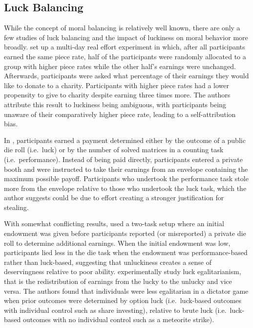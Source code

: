 \documentclass{article}
\begin{document}
\subsection{Luck Balancing}
While the concept of moral balancing is relatively well known, there are only a few studies of luck balancing and the impact of luckiness on moral behavior more broadly. \textcite{Tonin2017} set up a multi-day real effort experiment in which, after all participants earned the same piece rate, half of the participants were randomly allocated to a group with higher piece rates while the other half's earnings were unchanged. Afterwards, participants were asked what percentage of their earnings they would like to donate to a charity. Participants with higher piece rates had a lower propensity to give to charity despite earning three times more. The authors attribute this result to luckiness being ambiguous, with participants being unaware of their comparatively higher piece rate, leading to a self-attribution bias. 
\par
In \textcite{Gravert2013}, participants earned a payment determined either by the outcome of a public die roll (i.e.\ luck) or by the number of solved matrices in a counting task (i.e.\ performance). Instead of being paid directly, participants entered a private booth and were instructed to take their earnings from an envelope containing the maximum possible payoff. Participants who undertook the performance task stole more from the envelope relative to those who undertook the luck task, which the author suggests could be due to effort creating a stronger justification for stealing. 
\par
With somewhat conflicting results, \textcite{Fries2021} used a two-task setup where an initial endowment was given before participants reported (or misreported) a private die roll to determine additional earnings. When the initial endowment was low, participants lied less in the die task when the endowment was performance-based rather than luck-based, suggesting that unluckiness creates a sense of deservingness relative to poor ability. \textcite{Tinghoeg2017} experimentally study luck egalitarianism, that is the redistribution of earnings from the lucky to the unlucky and vice versa. The authors found that individuals were less egalitarian in a dictator game when prior outcomes were determined by option luck (i.e.\ luck-based outcomes with individual control such as share investing), relative to brute luck (i.e.\ luck-based outcomes with no individual control such as a meteorite strike).
\par
\end{document}
